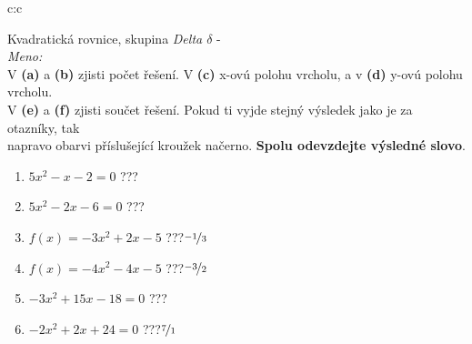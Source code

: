 \documentclass[10pt]{report}
\begin{document}
\clearpage
\thispagestyle{empty}
\begin{tabular}{c:c}
\begin{minipage}[c][99mm][t]{0.49\linewidth}
\begin{center}
\vspace{7mm}
{\huge Kvadratická rovnice, skupina \textit{Delta $\delta$} -}\\[4.5mm]
\textit{Meno:}\phantom{xxxxxxxxxxxxxxxxxxxxxxxxxxxxxxxxxxxxxxxxxxxxxxxxxxxxxxxxxxxxxxxxx}\\[3.5mm]
V \textbf{(a)} a \textbf{(b)} zjisti počet řešení. V \textbf{(c)} x-ovú polohu vrcholu, a v \textbf{(d)} y-ovú polohu vrcholu.\\V \textbf{(e)} a \textbf{(f)} zjisti součet řešení. Pokud ti vyjde stejný výsledek jako je za otazníky, tak\\napravo obarvi příslušející kroužek načerno. \textbf{Spolu odevzdejte výsledné slovo}.\\[3mm]
\begin{minipage}{0.77\linewidth}
\begin{center}
\begin{varwidth}{\textwidth}
\begin{enumerate}
\large
\item $5x^2-x-2=0$\quad \dotfill\; ???\;\dotfill {}
\item $5x^2-2x-6=0$\quad \dotfill\; ???\;\dotfill {}
\item $f(x)=-3x^2+2x-5$\quad \dotfill\; ???\;\dotfill \quad $\nicefrac{-1}{3}$
\item $f(x)=-4x^2-4x-5$\quad \dotfill\; ???\;\dotfill \quad $\nicefrac{-3}{2}$
\item $-3x^2+15x-18=0$\quad \dotfill\; ???\;\dotfill {}
\item $-2x^2+2x+24=0$\quad \dotfill\; ???\;\dotfill \quad $\nicefrac{7}{1}$
\end{enumerate}
\end{varwidth}
\end{center}
\end{minipage}

\end{center}
\end{minipage}
\end{tabular}
\end{document}
